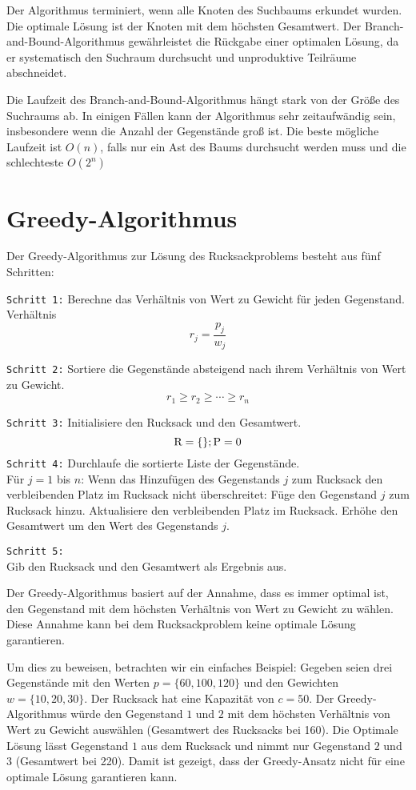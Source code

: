 Der Algorithmus terminiert, wenn alle Knoten des Suchbaums 
erkundet wurden. Die optimale Lösung ist der Knoten mit dem 
höchsten Gesamtwert. Der Branch-and-Bound-Algorithmus 
gewährleistet die Rückgabe einer optimalen Lösung, da er 
systematisch den Suchraum durchsucht und unproduktive 
Teilräume abschneidet.

Die Laufzeit des 
Branch-and-Bound-Algorithmus hängt stark von der Größe des 
Suchraums ab. In einigen Fällen kann der Algorithmus 
sehr zeitaufwändig sein, insbesondere wenn die Anzahl der 
Gegenstände groß ist. Die beste mögliche Laufzeit ist 
$O(n)$, falls nur ein Ast des Baums durchsucht werden muss und 
die schlechteste $O(2^n)$\ \cite[vgl.]{Martello1987}

\section{Greedy-Algorithmus}
Der Greedy-Algorithmus zur Lösung des Rucksackproblems besteht 
aus fünf Schritten:

\texttt{Schritt 1:} Berechne das Verhältnis von Wert zu Gewicht für 
jeden Gegenstand.
Verhältnis \[r_j = \frac{p_j}{w_j}\]

\texttt{Schritt 2:} Sortiere die Gegenstände absteigend nach ihrem 
Verhältnis von Wert zu Gewicht.
\[r_1 \geq r_2 \geq \cdots \geq r_n\]

\texttt{Schritt 3:} Initialisiere den Rucksack und den Gesamtwert.
\[   \text{R} = \{\}; \\
    \text{P} = 0 \]
\texttt{Schritt 4:} Durchlaufe die sortierte Liste der Gegenstände.\\
Für $j = 1$ bis $n$: 
Wenn das Hinzufügen des Gegenstands $j$ zum Rucksack den 
verbleibenden Platz im Rucksack nicht überschreitet:
Füge den Gegenstand $j$ zum Rucksack hinzu.
Aktualisiere den verbleibenden Platz im Rucksack.
Erhöhe den Gesamtwert um den Wert des Gegenstands $j$.

\texttt{Schritt 5:} \\Gib den Rucksack und den Gesamtwert als Ergebnis 
aus.

Der Greedy-Algorithmus basiert auf der Annahme, dass es 
immer optimal ist, den Gegenstand mit dem höchsten Verhältnis 
von Wert zu Gewicht zu wählen. Diese Annahme kann bei dem Rucksackproblem
keine optimale Lösung garantieren.

Um dies zu beweisen, betrachten wir ein einfaches Beispiel: 
Gegeben seien drei Gegenstände mit den Werten $p = \{60, 100, 120\}$ 
und den Gewichten $w =\{10, 20, 30\}$. Der Rucksack hat eine Kapazität 
von $c = 50$. Der Greedy-Algorithmus würde den Gegenstand $1$ und $2$ mit 
dem höchsten Verhältnis von Wert zu Gewicht auswählen (Gesamtwert des Rucksacks bei 160). Die Optimale 
Lösung lässt Gegenstand $1$ aus dem Rucksack und nimmt nur Gegenstand $2$ und $3$ (Gesamtwert bei 220).
Damit ist gezeigt, dass der Greedy-Ansatz nicht für eine optimale Lösung 
garantieren kann.

